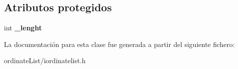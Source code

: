 \subsection*{Atributos protegidos}
\begin{DoxyCompactItemize}
\item 
\hypertarget{classIOrdinateList_a28c0ecc93c212cf1fb6fa63a7227eb4a}{int {\bfseries \-\_\-lenght}}\label{classIOrdinateList_a28c0ecc93c212cf1fb6fa63a7227eb4a}

\end{DoxyCompactItemize}


La documentación para esta clase fue generada a partir del siguiente fichero\-:\begin{DoxyCompactItemize}
\item 
ordinate\-List/iordinatelist.\-h\end{DoxyCompactItemize}

